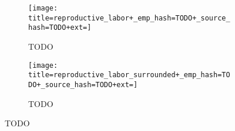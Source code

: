 \begin{figure}[!htbp]
\begin{center}

\begin{subfigure}[b]{\columnwidth}
\texttt{[image: title=reproductive\_labor+\_emp\_hash=TODO+\_source\_hash=TODO+ext=]}
\caption{TODO}
\label{fig:TODO}
\end{subfigure}

\begin{subfigure}[b]{\columnwidth}
\texttt{[image: title=reproductive\_labor\_surrounded+\_emp\_hash=TODO+\_source\_hash=TODO+ext=]}
\caption{TODO}
\label{fig:TODO}
\end{subfigure}

\caption{
TODO
}
\label{fig:reproductive_labor}
\end{center}
\end{figure}
